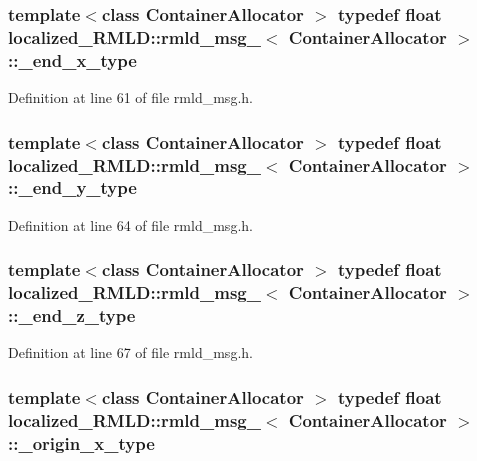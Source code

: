 \subsubsection[{\_\-end\_\-x\_\-type}]{\setlength{\rightskip}{0pt plus 5cm}template$<$class ContainerAllocator $>$ typedef float {\bf localized\_\-RMLD::rmld\_\-msg\_\-}$<$ ContainerAllocator $>$::{\bf \_\-end\_\-x\_\-type}}\label{structlocalized__RMLD_1_1rmld__msg___aa91b68643bd0ec2c74984ccde2028b83}


Definition at line 61 of file rmld\_\-msg.h.

\subsubsection[{\_\-end\_\-y\_\-type}]{\setlength{\rightskip}{0pt plus 5cm}template$<$class ContainerAllocator $>$ typedef float {\bf localized\_\-RMLD::rmld\_\-msg\_\-}$<$ ContainerAllocator $>$::{\bf \_\-end\_\-y\_\-type}}\label{structlocalized__RMLD_1_1rmld__msg___aa07707c244556d92bd0a04afea592fc5}


Definition at line 64 of file rmld\_\-msg.h.

\subsubsection[{\_\-end\_\-z\_\-type}]{\setlength{\rightskip}{0pt plus 5cm}template$<$class ContainerAllocator $>$ typedef float {\bf localized\_\-RMLD::rmld\_\-msg\_\-}$<$ ContainerAllocator $>$::{\bf \_\-end\_\-z\_\-type}}\label{structlocalized__RMLD_1_1rmld__msg___acbd82983ec0c952a0f44e7a75d77dc3a}


Definition at line 67 of file rmld\_\-msg.h.

\subsubsection[{\_\-origin\_\-x\_\-type}]{\setlength{\rightskip}{0pt plus 5cm}template$<$class ContainerAllocator $>$ typedef float {\bf localized\_\-RMLD::rmld\_\-msg\_\-}$<$ ContainerAllocator $>$::{\bf \_\-origin\_\-x\_\-type}}\label{structlocalized__RMLD_1_1rmld__msg___afd95e4fc509ff2cef78e4c618d373ad3}


